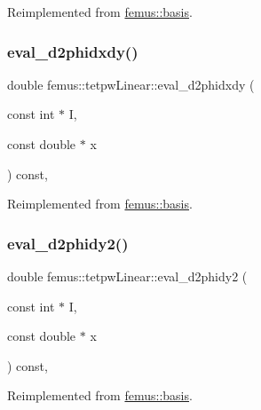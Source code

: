 Reimplemented from \mbox{\hyperlink{classfemus_1_1basis_a0a9839e75d1c9c8302486fc072eed028}{femus\+::basis}}.

\mbox{\label{classfemus_1_1tetpw_linear_ac652a9ba4f2d1fd2a140563ab97172e3}} 
\subsubsection{\texorpdfstring{eval\+\_\+d2phidxdy()}{eval\_d2phidxdy()}}
{\footnotesize\ttfamily double femus\+::tetpw\+Linear\+::eval\+\_\+d2phidxdy (\begin{DoxyParamCaption}\item[{const int $\ast$}]{I,  }\item[{const double $\ast$}]{x }\end{DoxyParamCaption}) const\hspace{0.3cm}{\ttfamily [inline]}, {\ttfamily [virtual]}}



Reimplemented from \mbox{\hyperlink{classfemus_1_1basis_ac9feaf9e60421143db2a3708f3c7fa48}{femus\+::basis}}.

\mbox{\label{classfemus_1_1tetpw_linear_af2376253bf50baccdfe001037aec48a2}} 
\subsubsection{\texorpdfstring{eval\+\_\+d2phidy2()}{eval\_d2phidy2()}}
{\footnotesize\ttfamily double femus\+::tetpw\+Linear\+::eval\+\_\+d2phidy2 (\begin{DoxyParamCaption}\item[{const int $\ast$}]{I,  }\item[{const double $\ast$}]{x }\end{DoxyParamCaption}) const\hspace{0.3cm}{\ttfamily [inline]}, {\ttfamily [virtual]}}



Reimplemented from \mbox{\hyperlink{classfemus_1_1basis_a0febb29fe4b32213ff8d6d428f7241cd}{femus\+::basis}}.

